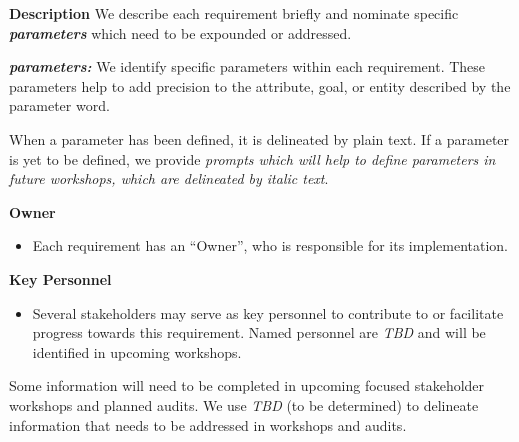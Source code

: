 \documentclass[
  letterpaper,
  DIV=11,
  numbers=noendperiod]{scrreport}
\providecommand{\tightlist}{%
  \setlength{\itemsep}{0pt}\setlength{\parskip}{0pt}}\usepackage{longtable,booktabs,array}
\begin{document}
\textbf{Description} We describe each requirement briefly and nominate
specific \textbf{\emph{parameters}} which need to be expounded or
addressed.

\textbf{\emph{parameters:}} We identify specific parameters within each
requirement. These parameters help to add precision to the attribute,
goal, or entity described by the parameter word.

\begin{tcolorbox}[enhanced jigsaw, arc=.35mm, breakable, coltitle=black, toptitle=1mm, colbacktitle=quarto-callout-note-color!10!white, toprule=.15mm, left=2mm, bottomrule=.15mm, opacitybacktitle=0.6, titlerule=0mm, colback=white, opacityback=0, title=\textcolor{quarto-callout-note-color}{\faInfo}\hspace{0.5em}{Note}, bottomtitle=1mm, colframe=quarto-callout-note-color-frame, leftrule=.75mm, rightrule=.15mm]

When a parameter has been defined, it is delineated by plain text. If a
parameter is yet to be defined, we provide \emph{prompts which will help
to define parameters in future workshops, which are delineated by italic
text}.

\end{tcolorbox}

\textbf{Owner}

\begin{itemize}
\tightlist
\item
  Each requirement has an ``Owner'', who is responsible for its
  implementation.
\end{itemize}

\textbf{Key Personnel}

\begin{itemize}
\tightlist
\item
  Several stakeholders may serve as key personnel to contribute to or
  facilitate progress towards this requirement. Named personnel are
  \emph{TBD} and will be identified in upcoming workshops.
\end{itemize}

\begin{tcolorbox}[enhanced jigsaw, arc=.35mm, breakable, coltitle=black, toptitle=1mm, colbacktitle=quarto-callout-note-color!10!white, toprule=.15mm, left=2mm, bottomrule=.15mm, opacitybacktitle=0.6, titlerule=0mm, colback=white, opacityback=0, title=\textcolor{quarto-callout-note-color}{\faInfo}\hspace{0.5em}{Note}, bottomtitle=1mm, colframe=quarto-callout-note-color-frame, leftrule=.75mm, rightrule=.15mm]

Some information will need to be completed in upcoming focused
stakeholder workshops and planned audits. We use \emph{TBD} (to be
determined) to delineate information that needs to be addressed in
workshops and audits.

\end{tcolorbox}
\end{document}
